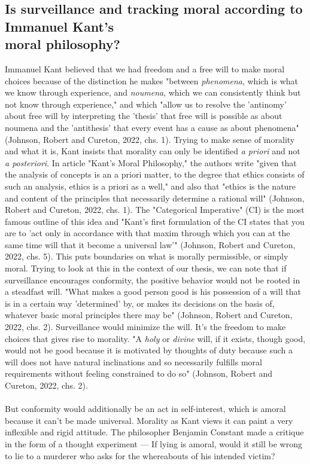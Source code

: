 \documentclass[11pt]{article}
\begin{document}
\subsection{Is surveillance and tracking moral according to Immanuel Kant's \\
moral philosophy?}
Immanuel Kant believed that we had freedom and a free will to make moral choices because of the distinction he makes "between \textit{phenomena}, which is what we know through experience, and \textit{noumena}, which we can consistently think but not know through experience," and which "allow us to resolve the 'antinomy' about free will by interpreting the 'thesis' that free will is possible as about noumena and the 'antithesis' that every event has a cause as about phenomena" (Johnson, Robert and Cureton, 2022, chs. 1). Trying to make sense of morality and what it is, Kant insists that morality can only be identified \textit{a priori} and not \textit{a posteriori}. In article "Kant’s Moral Philosophy," the authors write "given that the analysis of concepts is an a priori matter, to the degree that ethics consists of such an analysis, ethics is a priori as a well," and also that "ethics is the nature and content of the principles that necessarily determine a rational will" (Johnson, Robert and Cureton, 2022, chs. 1). The "Categorical Imperative" (CI) is the most famous outline of this idea and "Kant’s first formulation of the CI states that you are to 'act only in accordance with that maxim through which you can at the same time will that it become a universal law'" (Johnson, Robert and Cureton, 2022, chs. 5). This puts boundaries on what is morally permissible, or simply moral. Trying to look at this in the context of our thesis, we can note that if surveillance encourages conformity, the positive behavior would not be rooted in a steadfast will. "What makes a good person good is his possession of a will that is in a certain way 'determined' by, or makes its decisions on the basis of, whatever basic moral principles there may be" (Johnson, Robert and Cureton, 2022, chs. 2). Surveillance would minimize the will. It's the freedom to make choices that gives rise to morality. "A \textit{holy} or \textit{divine} will, if it exists, though good, would not be good because it is motivated by thoughts of duty because such a will does not have natural inclinations and so necessarily fulfills moral requirements without feeling constrained to do so" (Johnson, Robert and Cureton, 2022, chs. 2). \\ \\
But conformity would additionally be an act in self-interest, which is amoral because it can't be made universal. Morality as Kant views it can paint a very inflexible and rigid attitude. The philosopher Benjamin Constant made a critique in the form of a thought experiment --- If lying is amoral, would it still be wrong to lie to a murderer who asks for the whereabouts of his intended victim? 
\\
\end{document}
